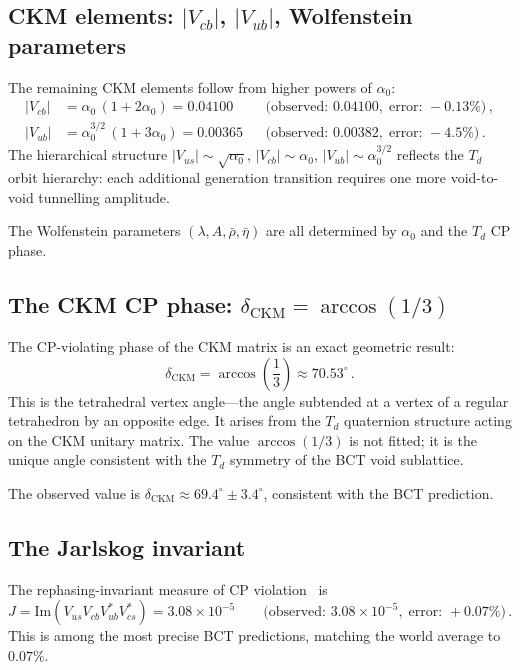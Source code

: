\documentclass[review,number,sort&compress]{elsarticle}
\newcommand{\azero}{\alpha_0}
\newcommand{\Td}{T_d}
\begin{document}
\subsection{CKM elements: $|V_{cb}|$, $|V_{ub}|$, Wolfenstein parameters}

The remaining CKM elements follow from higher powers of $\azero$:
\begin{align}
  |V_{cb}| &= \azero\,(1 + 2\azero) = 0.04100 &&
  \bigl(\text{observed: } 0.04100,\;\text{error: } -0.13\%\bigr)\,,
  \label{eq:Vcb} \\
  |V_{ub}| &= \azero^{3/2}\,(1 + 3\azero) = 0.00365 &&
  \bigl(\text{observed: } 0.00382,\;\text{error: } -4.5\%\bigr)\,.
  \label{eq:Vub}
\end{align}
The hierarchical structure $|V_{us}| \sim \sqrt{\azero}$,
$|V_{cb}| \sim \azero$, $|V_{ub}| \sim \azero^{3/2}$ reflects the
$\Td$ orbit hierarchy: each additional generation transition requires
one more void-to-void tunnelling amplitude.

The Wolfenstein parameters $(\lambda, A, \bar{\rho}, \bar{\eta})$
are all determined by $\azero$ and the $\Td$ CP phase.

\subsection{The CKM CP phase: $\delta_{\mathrm{CKM}} = \arccos(1/3)$}

The CP-violating phase of the CKM matrix is an exact geometric result:
\begin{equation}
  \delta_{\mathrm{CKM}} = \arccos\!\left(\frac{1}{3}\right)
  \approx 70.53^\circ\,.
  \label{eq:deltaCKM}
\end{equation}
This is the tetrahedral vertex angle---the angle subtended at a vertex
of a regular tetrahedron by an opposite edge. It arises from the $\Td$
quaternion structure acting on the CKM unitary matrix. The value
$\arccos(1/3)$ is not fitted; it is the unique angle consistent with
the $\Td$ symmetry of the BCT void sublattice.

The observed value is $\delta_{\mathrm{CKM}} \approx 69.4^\circ
\pm 3.4^\circ$, consistent with the BCT prediction.

\subsection{The Jarlskog invariant}

The rephasing-invariant measure of CP violation~\cite{Jarlskog1985} is
\begin{equation}
  J = \mathrm{Im}(V_{us}V_{cb}V_{ub}^*V_{cs}^*)
  = 3.08 \times 10^{-5} \qquad
  \bigl(\text{observed: } 3.08 \times 10^{-5},\;
  \text{error: } +0.07\%\bigr)\,.
  \label{eq:J}
\end{equation}
This is among the most precise BCT predictions, matching the world
average to $0.07\%$.
\end{document}
